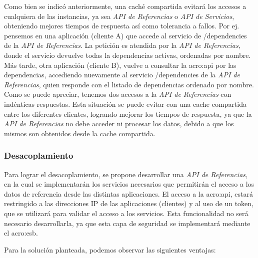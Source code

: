 Como bien se indicó anteriormente, una caché compartida evitará los accesos a cualquiera de las instancias, ya sea \textit{API de Referencias} o \textit{API de Servicios}, obteniendo mejores tiempos de respuesta así como tolerancia a fallos.  Por ej. pensemos en una aplicación (cliente A) que accede al servicio de /dependencies de la \textit{API de Referencias}.  La petición es atendida por la \textit{API de Referencias}, donde el servicio devuelve todas la dependencias activas, ordenadas por nombre.  Más tarde, otra aplicación (cliente B), vuelve a consultar la \gls{acro:api} por las dependencias, accediendo nuevamente al servicio /dependencies de la \textit{API de Referencias}, quien responde con el listado de dependencias ordenado por nombre.  Como se puede apreciar, tenemos dos accesos a la \textit{API de Referencias} con indénticas respuestas.  Esta situación se puede evitar con una cache compartida entre los diferentes clientes, logrando mejorar los tiempos de respuesta, ya que la \textit{API de Referencias} no debe acceder ni procesar los datos, debido a que los mismos son obtenidos desde la cache compartida.


\subsubsection{Desacoplamiento}

Para lograr el desacoplamiento, se propone desarrollar una \textit{API de Referencias}, en la cual se implementarán los servicios necesarios que permitirán el acceso a los datos de referencia desde las distintas aplicaciones.  El acceso a la \gls{acro:api}, estará restringido a las direcciones IP de las aplicaciones (clientes) y al uso de un token, que se utilizará para validar el acceso a los servicios.  Esta funcionalidad no será necesario desarrollarla, ya que esta capa de seguridad se implementará mediante el \gls{acro:esb}.

Para la solución planteada, podemos observar las siguientes ventajas:

